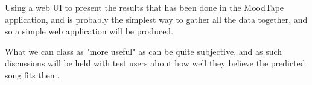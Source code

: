 Using a web UI to present the results that has been done in the MoodTape application, and is probably the simplest way to gather all the data together, and so a simple web application will be produced. 

What we can class as "more useful" as can be quite subjective, and as such discussions will be held with test users about how well they believe the predicted song fits them.\